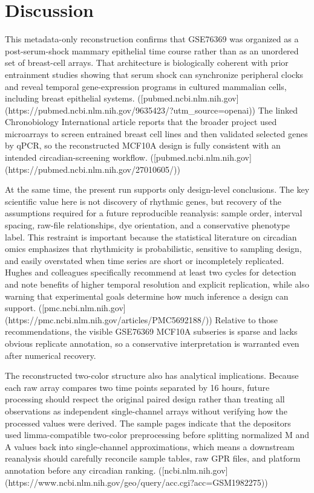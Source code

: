 \documentclass[11pt]{article}
\begin{document}
\section{Discussion}
This metadata-only reconstruction confirms that GSE76369 was organized as a post-serum-shock mammary epithelial time course rather than as an unordered set of breast-cell arrays. That architecture is biologically coherent with prior entrainment studies showing that serum shock can synchronize peripheral clocks and reveal temporal gene-expression programs in cultured mammalian cells, including breast epithelial systems. ([pubmed.ncbi.nlm.nih.gov](https://pubmed.ncbi.nlm.nih.gov/9635423/?utm\_source=openai)) The linked Chronobiology International article reports that the broader project used microarrays to screen entrained breast cell lines and then validated selected genes by qPCR, so the reconstructed MCF10A design is fully consistent with an intended circadian-screening workflow. ([pubmed.ncbi.nlm.nih.gov](https://pubmed.ncbi.nlm.nih.gov/27010605/))

At the same time, the present run supports only design-level conclusions. The key scientific value here is not discovery of rhythmic genes, but recovery of the assumptions required for a future reproducible reanalysis: sample order, interval spacing, raw-file relationships, dye orientation, and a conservative phenotype label. This restraint is important because the statistical literature on circadian omics emphasizes that rhythmicity is probabilistic, sensitive to sampling design, and easily overstated when time series are short or incompletely replicated. Hughes and colleagues specifically recommend at least two cycles for detection and note benefits of higher temporal resolution and explicit replication, while also warning that experimental goals determine how much inference a design can support. ([pmc.ncbi.nlm.nih.gov](https://pmc.ncbi.nlm.nih.gov/articles/PMC5692188/)) Relative to those recommendations, the visible GSE76369 MCF10A subseries is sparse and lacks obvious replicate annotation, so a conservative interpretation is warranted even after numerical recovery.

The reconstructed two-color structure also has analytical implications. Because each raw array compares two time points separated by 16 hours, future processing should respect the original paired design rather than treating all observations as independent single-channel arrays without verifying how the processed values were derived. The sample pages indicate that the depositors used limma-compatible two-color preprocessing before splitting normalized M and A values back into single-channel approximations, which means a downstream reanalysis should carefully reconcile sample tables, raw GPR files, and platform annotation before any circadian ranking. ([ncbi.nlm.nih.gov](https://www.ncbi.nlm.nih.gov/geo/query/acc.cgi?acc=GSM1982275))
\end{document}
